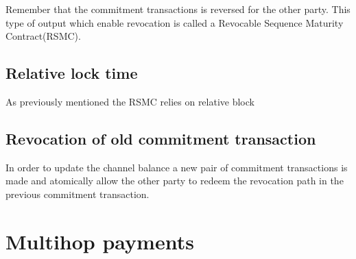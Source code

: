 Remember that the commitment transactions is reversed for the other party. This type of output which enable revocation is called a Revocable Sequence Maturity Contract(RSMC).

\subsection{Relative lock time}
\label{sec:rlt}

As previously mentioned the RSMC relies on relative block 

\subsection{Revocation of old commitment transaction}

In order to update the channel balance a new pair of commitment transactions is made and atomically allow the other party to redeem the revocation path in the previous commitment transaction.


\section{Multihop payments}

